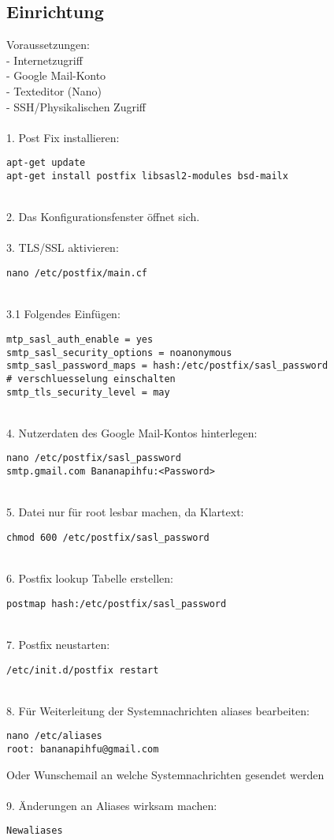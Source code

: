 \subsection{Einrichtung}
Voraussetzungen:\\
- Internetzugriff\\
- Google Mail-Konto\\
- Texteditor (Nano)\\
- SSH/Physikalischen Zugriff\\
~\\
1. Post Fix installieren:
\begin{lstlisting}
apt-get update
apt-get install postfix libsasl2-modules bsd-mailx
\end{lstlisting}
~\\
2. Das Konfigurationsfenster öffnet sich.\\
~\\
3. TLS/SSL aktivieren:
\begin{lstlisting}
nano /etc/postfix/main.cf
\end{lstlisting}
~\\
3.1 Folgendes Einfügen:
\begin{lstlisting}
mtp_sasl_auth_enable = yes
smtp_sasl_security_options = noanonymous
smtp_sasl_password_maps = hash:/etc/postfix/sasl_password
# verschluesselung einschalten
smtp_tls_security_level = may
\end{lstlisting}
~\\
4. Nutzerdaten des Google Mail-Kontos hinterlegen:
\begin{lstlisting}
nano /etc/postfix/sasl_password
smtp.gmail.com Bananapihfu:<Password>
\end{lstlisting}
~\\
5. Datei nur für root lesbar machen, da Klartext:
\begin{lstlisting}
chmod 600 /etc/postfix/sasl_password 
\end{lstlisting}
~\\
6. Postfix lookup Tabelle erstellen:
\begin{lstlisting}
postmap hash:/etc/postfix/sasl_password
\end{lstlisting}
~\\
7. Postfix neustarten:
\begin{lstlisting}
/etc/init.d/postfix restart
\end{lstlisting}
~\\
8. Für Weiterleitung der Systemnachrichten aliases bearbeiten:
\begin{lstlisting}
nano /etc/aliases 
root: bananapihfu@gmail.com
\end{lstlisting}
Oder Wunschemail an welche Systemnachrichten gesendet werden\\
~\\
9. Änderungen an Aliases wirksam machen:
\begin{lstlisting}
Newaliases
\end{lstlisting}





